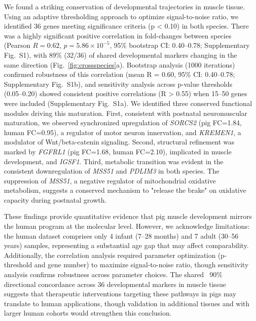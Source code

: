 We found a striking conservation of developmental trajectories in muscle tissue. Using an adaptive thresholding approach to optimize signal-to-noise ratio, we identified 36 genes meeting significance criteria (p < 0.10) in both species. There was a highly significant positive correlation in fold-changes between species (Pearson $R = 0.62$, $p = 5.86 \times 10^{-5}$, 95\% bootstrap CI: 0.40--0.78; Supplementary Fig.~S1), with 89\% (32/36) of shared developmental markers changing in the same direction (Fig.~\ref{fig:crossspecies}a). Bootstrap analysis (1000 iterations) confirmed robustness of this correlation (mean R = 0.60, 95\% CI: 0.40--0.78; Supplementary Fig.~S1b), and sensitivity analysis across p-value thresholds (0.05--0.20) showed consistent positive correlations (R > 0.55) when 15--50 genes were included (Supplementary Fig.~S1a). We identified three conserved functional modules driving this maturation. First, consistent with postnatal neuromuscular maturation, we observed synchronized upregulation of \textit{SORCS2} (pig FC=1.84, human FC=0.95), a regulator of motor neuron innervation, and \textit{KREMEN1}, a modulator of Wnt/beta-catenin signaling. Second, structural refinement was marked by \textit{FGFRL1} (pig FC=1.68, human FC=2.10), implicated in muscle development, and \textit{IGSF1}. Third, metabolic transition was evident in the consistent downregulation of \textit{MSS51} and \textit{PDLIM3} in both species. The suppression of \textit{MSS51}, a negative regulator of mitochondrial oxidative metabolism, suggests a conserved mechanism to "release the brake" on oxidative capacity during postnatal growth. 

These findings provide quantitative evidence that pig muscle development mirrors the human program at the molecular level. However, we acknowledge limitations: the human dataset comprises only 4 infant (7--28 months) and 7 adult (30--56 years) samples, representing a substantial age gap that may affect comparability. Additionally, the correlation analysis required parameter optimization (p-threshold and gene number) to maximize signal-to-noise ratio, though sensitivity analysis confirms robustness across parameter choices. The shared ~90\% directional concordance across 36 developmental markers in muscle tissue suggests that therapeutic interventions targeting these pathways in pigs may translate to human applications, though validation in additional tissues and with larger human cohorts would strengthen this conclusion.